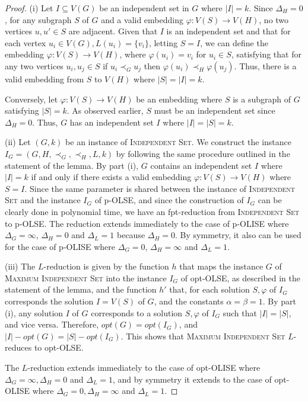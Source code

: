 \documentclass[11pt]{article}
\let\phi=\varphi
\begin{document}
\begin{proof}

(i) Let $I \subseteq V(G)$ be an independent set in $G$ where $|I| = k$.  Since $\Delta_H = 0$, for any subgraph $S$ of $G$ and a valid embedding $\phi : V(S) \to V(H)$, no two vertices $u, u' \in S$ are adjacent. Given that $I$ is an independent set and that for each vertex $u_i \in V(G), L(u_i) = \{v_i\}$, letting $S = I$, we can define the embedding $\phi : V(S) \to V(H)$, where $\phi(u_i) = v_i$ for $u_i \in S$, satisfying that for any two vertices $u_i, u_j \in S$ if $u_i \prec_G u_j$ then $\phi(u_i) \prec_H \phi(u_j)$.  Thus, there is a valid embedding from $S$ to $V(H)$ where $|S| = |I| = k$.

Conversely, let $\phi : V(S) \to V(H)$ be an embedding where $S$ is a subgraph of $G$ satisfying $|S| = k$.  As observed earlier, $S$ must be an independent set since $\Delta_H = 0$. Thus, $G$ has an independent set $I$ where $|I| = |S| = k$.

(ii) Let $(G,k)$ be an instance of \textsc{Independent Set}. We construct the instance \newline $I_G=(G, H, \prec_G, \prec_H, L, k)$ by following the same procedure outlined in the statement of the lemma.  By part (i), $G$ contains an independent set $I$ where $|I| = k$ if and only if there exists a valid embedding $\phi : V(S) \to V(H)$ where $S = I$. Since the same parameter is shared between the instance of \textsc{Independent Set} and the instance $I_G$ of p-OLSE, and since the construction of $I_G$ can be clearly done in polynomial time, we have an fpt-reduction from \textsc{Independent Set} to p-OLSE. The reduction extends immediately to the case of p-OLISE where $\Delta_G = \infty$, $\Delta_H = 0$  and $\Delta_L = 1$ because $\Delta_H = 0$.  By symmetry, it also can be used for the case of p-OLISE where $\Delta_G = 0$, $\Delta_H = \infty$ and $\Delta_L = 1$.

(iii) The $L$-reduction is given by the function $h$ that maps the instance $G$ of \textsc{Maximum Independent Set} into the instance $I_G$ of opt-OLSE, as described in the statement of the lemma, and the function $h'$ that, for each solution $S, \phi$ of $I_G$ corresponds the solution $I=V(S)$ of $G$, and the constants $\alpha = \beta =1$. By part (i), any solution $I$ of $G$ corresponds to a solution $S, \phi$ of $I_G$ such that $|I| = |S|$, and vice versa. Therefore, $opt(G) = opt(I_G)$, and $|I| - opt(G) = |S| - opt(I_G)$. This shows that \textsc{Maximum Independent Set} $L$-reduces to opt-OLSE.

The $L$-reduction extends immediately to the case of opt-OLISE where $\Delta_G=\infty, \Delta_H=0$ and $\Delta_L=1$, and by symmetry it extends to the case of opt-OLISE where $\Delta_G=0, \Delta_H=\infty$ and $\Delta_L=1$. \end{proof}
\end{document}
